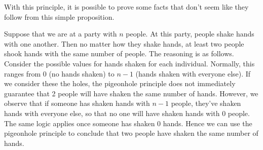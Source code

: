 With this principle, it is possible to prove some facts that don't seem like they follow from this simple proposition.

\begin{example}
Suppose that we are at a party with $n$ people. At this party, people shake hands with one another. Then no matter how they shake hands, at least two people shook hands with the same number of people. The reasoning is as follows. Consider the possible values for hands shaken for each individual. Normally, this ranges from $0$ (no hands shaken) to $n-1$ (hands shaken with everyone else). If we consider these the holes, the pigeonhole principle does not immediately guarantee that 2 people will have shaken the same number of hands. However, we observe that if someone has shaken hands with $n-1$ people, they've shaken hands with everyone else, so that no one will have shaken hands with $0$ people. The same logic applies once someone has shaken $0$ hands. Hence we can use the pigeonhole principle to conclude that two people have shaken the same number of hands.
\end{example}

